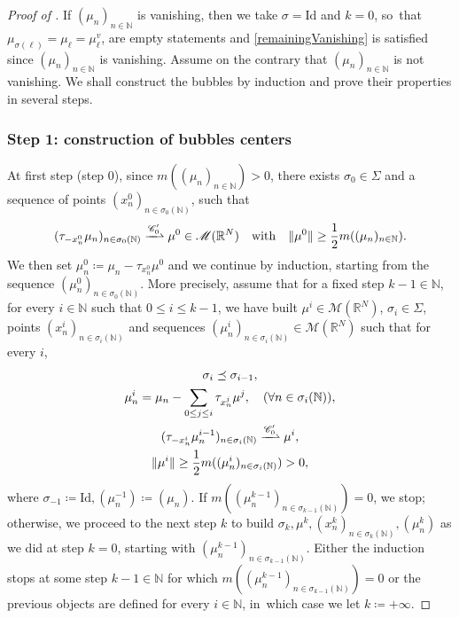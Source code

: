 \documentclass[10pt]{amsart}
\theoremstyle{plain}
\theoremstyle{definition}
\newcommand{\N}{\mathbb{N}}
\newcommand{\R}{\mathbb{R}}
\newcommand{\Cspace}{\mathscr{C}}
\newcommand{\Mspace}{\mathscr{M}}
\newcommand{\id}{\mathrm{Id}}
\DeclarePairedDelimiter{\norm}{\lVert}{\rVert}
\newcommand{\mweakto}{\xrightharpoonup{\Cspace_0'}}
\begin{document}
\begin{proof}[Proof of ]
If \((\mu_n)_{n\in\N}\) is vanishing, then we take $\sigma = \id$ and $k=0$, so~that $\mu_{\sigma(\ell)} = \mu_\ell = \mu^v_\ell$,  are empty statements and \ref{remainingVanishing} is satisfied since $(\mu_n)_{n\in\N}$ is vanishing. Assume on the contrary that \((\mu_n)_{n\in\N}\) is not vanishing. We shall construct the bubbles by induction and prove their properties in several steps.

\subsubsection*{Step 1: construction of bubbles centers} At first step (step $0$), since \(m((\mu_n)_{n\in\N})>0\), there exists $\sigma_0 \in \Sigma$ and a sequence of points \((x^0_{n})_{n \in \sigma_0(\N)}\), such that
\begin{equation}
(\tau_{-x^0_{n}} \mu_n)_{n \in \sigma_0(\N)}\mweakto\mu^0\in\Mspace(\R^N)\quad\text{with}\quad\norm{\mu^0} \geq \frac 12 m((\mu_n)_{n\in\N}).
\end{equation}
We then set \(\mu^0_n\coloneqq\mu_n-\tau_{x^0_n}\mu^0\) and we continue by induction, starting from the sequence \((\mu^0_n)_{n\in\sigma_0(\N)}\). More precisely, assume that for a fixed step $k-1 \in \N$, for every \(i\in\N\) such that \(0\le i\le k-1\), we have built $\mu^i \in \Mspace(\R^N)$, $\sigma_i \in \Sigma$, points $(x^i_n)_{n\in \sigma_i(\N)}$ and sequences $(\mu^i_{n})_{n\in \sigma_i(\N)} \in \Mspace(\R^N)$ such that for every $i$,
\begin{gather}
\sigma_i \preceq \sigma_{i-1},\label{bubbleInduction1}\\
\mu^i_{n} = \mu_n -\sum_{0\leq j \leq i} \tau_{x^j_n}\mu^j, \quad (\forall n \in \sigma_i(\N)),\label{bubbleInduction2}\\
(\tau_{-x^i_n} \mu^{i-1}_n)_{n\in\sigma_i(\N)} \mweakto \mu^i,\label{bubbleInduction3}\\
\norm{\mu^i} \geq \frac 12 m((\mu^i_n)_{n \in\sigma_i(\N)})>0,\label{bubbleInduction4}
\end{gather}
where $\sigma_{-1} \coloneqq \id, (\mu_n^{-1}) \coloneqq (\mu_n)$. If $m((\mu^{k-1}_n)_{n\in \sigma_{k-1}(\N)}) = 0$, we stop; otherwise, we proceed to the next step $k$ to build $\sigma_k, \mu^k, (x_n^k)_{n\in\sigma_k(\N)}, (\mu_n^k)$ as we did at step $k=0$, starting with $(\mu^{k-1}_n)_{n\in\sigma_{k-1}(\N)}$. Either the induction stops at some step \(k-1\in\N\) for which \(m((\mu^{k-1}_{n})_{n\in \sigma_{k-1}(\N)})=0\) or the previous objects are defined for every \(i\in\N\), in~which case we let \(k \coloneqq +\infty\).


\end{proof}
\end{document}
